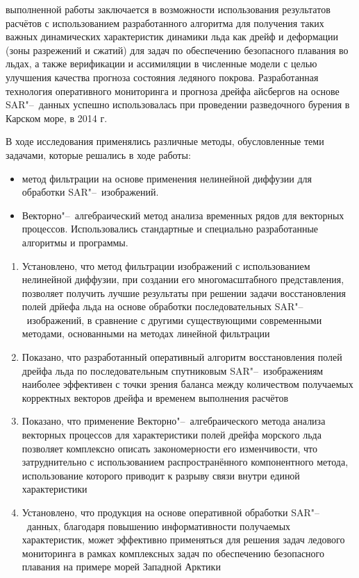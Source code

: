 {\influence} выполненной работы заключается в возможности использования результатов расчётов с использованием разработанного алгоритма для получения таких важных динамических характеристик динамики льда как дрейф и деформации (зоны разрежений и сжатий) для задач по обеспечению безопасного плавания во льдах, а также верификации и ассимиляции в численные модели с целью улучшения качества прогноза состояния ледяного покрова. 
Разработанная технология оперативного мониторинга и прогноза дрейфа айсбергов на основе SAR"--~данных успешно использовалась при проведении разведочного бурения в Карском море, в 2014 г.

{\methods} В ходе исследования применялись различные методы, обусловленные теми задачами, которые решались в ходе работы:
\noindent
\begin{itemize}
	\item метод фильтрации на основе применения нелинейной диффузии для обработки SAR"--~изображений.
	\item Векторно"--~алгебраический метод анализа временных рядов для векторных процессов.
Использовались стандартные и специально разработанные алгоритмы и программы.
\end{itemize}


{}
\begin{enumerate}
  \item Установлено, что метод фильтрации изображений с использованием нелинейной диффузии, при создании его многомасштабного представления, позволяет получить лучшие результаты при решении задачи восстановления полей дрйефа льда на основе обработки последовательных SAR"--~изображений, в сравнение с другими существующими современными методами, основанными на методах линейной фильтрации
  \item Показано, что разработанный оперативный алгоритм восстановления полей дрейфа льда по последовательным спутниковым SAR"--~изображениям наиболее эффективен с точки зрения баланса между количеством получаемых корректных векторов дрейфа и временем выполнения расчётов
  \item Показано, что применение Векторно"--~алгебраического метода анализа векторных процессов для характеристики полей дрейфа морского льда позволяет комплексно описать закономерности его изменчивости, что затруднительно с использованием распространённого компонентного метода, использование которого приводит к разрыву связи внутри единой характеристики
  \item Установлено, что продукция на основе оперативной обработки SAR"--~данных, благодаря повышению информативности получаемых характеристик, может эффективно применяться для решения задач ледового мониторинга в рамках комплексных задач по обеспечению безопасного плавания на примере морей Западной Арктики
\end{enumerate}


